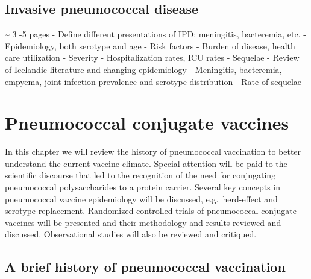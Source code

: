 \documentclass[]{book}
\theoremstyle{definition}
\theoremstyle{definition}
\theoremstyle{definition}
\theoremstyle{remark}
\begin{document}
\subsection{Invasive pneumococcal
disease}\label{invasive-pneumococcal-disease}

\textasciitilde{} 3 -5 pages - Define different presentations of IPD:
meningitis, bacteremia, etc. - Epidemiology, both serotype and age -
Risk factors - Burden of disease, health care utilization - Severity -
Hospitalization rates, ICU rates - Sequelae - Review of Icelandic
literature and changing epidemiology - Meningitis, bacteremia, empyema,
joint infection prevalence and serotype distribution - Rate of sequelae

\section{Pneumococcal conjugate
vaccines}\label{pneumococcal-conjugate-vaccines}

In this chapter we will review the history of pneumococcal vaccination
to better understand the current vaccine climate. Special attention will
be paid to the scientific discourse that led to the recognition of the
need for conjugating pneumococcal polysaccharides to a protein carrier.
Several key concepts in pneumococcal vaccine epidemiology will be
discussed, e.g.~herd-effect and serotype-replacement. Randomized
controlled trials of pneumococcal conjugate vaccines will be presented
and their methodology and results reviewed and discussed. Observational
studies will also be reviewed and critiqued.

\subsection{A brief history of pneumococcal
vaccination}\label{a-brief-history-of-pneumococcal-vaccination}
\end{document}
